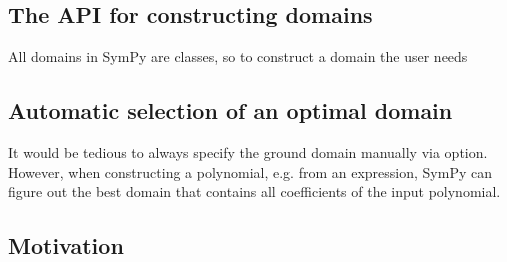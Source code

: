 \subsection{The API for constructing domains}

All domains in SymPy are classes, so to construct a domain the user needs


\subsection{Automatic selection of an optimal domain}

It would be tedious to always specify the ground domain manually via  option. However,
when constructing a polynomial, e.g. from an expression, SymPy can figure out the best domain
that contains all coefficients of the input polynomial.


\subsection{Motivation}

